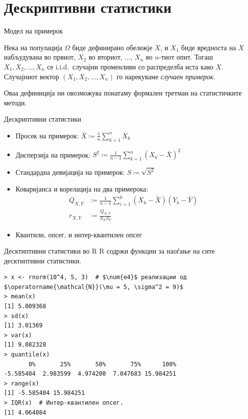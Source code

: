 \documentclass[hyperref={unicode}, xcolor={svgnames, table},
usepdftitle=false]{beamer}
\theoremstyle{remark}
\begin{document}
\section{Дескриптивни статистики}

\begin{frame}{Модел на примерок}
  \begin{definition}
    Нека на популација \(\Omega\) биде дефинирано обележје \(X\), и \(X_1\) биде
    вредноста на \(X\) набљудувана во првиот, \(X_2\) во вториот, ..., \(X_n\)
    во \(n\)-тиот опит.  Тогаш \(X_1, X_2, \ldots, X_n\) се i.i.d.\ случајни
    променливи со распределба иста како \(X\).  Случајниот вектор
    \((X_1, X_2, \ldots, X_n)\) го нарекуваме \emph{случаен примерок}.
  \end{definition}

  Оваа дефиниција ни овозможува понатаму формален третман на статистичките
  методи.
\end{frame}

\begin{frame}{Дескриптивни статистики}
  \begin{itemize}
  \item Просек на примерок:
    \(\bar{X} \coloneqq \frac{1}{n} \sum\nolimits_{k = 1}^{n} X_k\)
  \item Дисперзија на примерок:
    \(S^2 \coloneqq \frac{1}{n - 1} \sum\nolimits_{k = 1}^{n} (X_k -
    \bar{X})^2\)
  \item Стандардна девијација на примерок: \(S \coloneqq \sqrt{S^2}\)
  \item Коваријанса и корелација на два примерока:
    \begin{align*}
      Q_{X, Y} &\coloneqq \frac{1}{n - 1} \sum\limits_{i = 1}^{k} (X_k - \bar{X}) (Y_k - \bar{Y}) \\
      r_{X, Y} &\coloneqq \frac{Q_{X, Y}}{S_X S_Y}
    \end{align*}
  \item Квантили, опсег, и интер-квантилен опсег
  \end{itemize}
\end{frame}

\begin{frame}[fragile]{Десктиптивни статистики во R}
  R содржи функции за наоѓање на сите десктиптивни статистики.
\begin{verbatim}
> x <- rnorm(10^4, 5, 3)  # $\num{e4}$ реализации од $\operatorname{\mathcal{N}}(\mu = 5, \sigma^2 = 9)$
> mean(x)
[1] 5.009368
> sd(x)
[1] 3.01369
> var(x)
[1] 9.082328
> quantile(x)
       0%       25%       50%       75%      100%
-5.585404  2.983599  4.974200  7.047683 15.984251
> range(x)
[1] -5.585404 15.984251
> IQR(x)  # Интер-квантилен опсег.
[1] 4.064084
\end{verbatim}
\end{frame}
\end{document}
